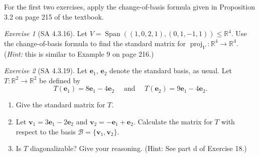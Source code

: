 \documentclass[fleqn,11pt]{paper}
\theoremstyle{remark}
\newtheorem*{exercise}{Exercise}
\newtheorem*{solution}{{\bf Solution}}
\newcommand\R{\fld{R}}
\newcommand\proj{\ensuremath{\operatorname{proj}}}
\renewcommand{\vec}[1]{\mathbf{#1}}
\newcommand{\<}{\ensuremath{\langle}}
\renewcommand{\>}{\ensuremath{\rangle}}
\newcommand\fld[1]{\ensuremath{\mathbb{#1}}}
\newcommand\ve{\vec{e}}
\newcommand\vv{\vec{v}}
\newcommand\sB{\ensuremath{\mathcal B}}
\newcommand\Span{\ensuremath{\operatorname{Span}}}
\begin{document}
\vfill

 For the first two exercises, apply the change-of-basis formula given
in Proposition 3.2 on page 215 of the textbook.
\newpage

\begin{exercise}[SA 4.3.16]
Let $V = \Span((1, 0, 2, 1), (0, 1,-1, 1)) \leq \R^4$.
Use the change-of-basis formula to find the standard matrix for $\proj_V: \R^4 \to \R^4$.
({\it Hint:} this is similar to Example 9 on page 216.)
\end{exercise}
  
\newpage

\begin{exercise}[SA 4.3.19] 
Let $\ve_1$, $\ve_2$ denote the standard basis, as usual. Let $T : \R^2 \to \R^2$ be defined by
\[
T (\ve_1) = 8\ve_1 - 4\ve_2 \quad \text{ and } \quad 
T (\ve_2) = 9\ve_1 - 4\ve_2.
\]
\begin{enumerate}
\item 
Give the standard matrix for $T$.
\item Let $\vv_1 = 3\ve_1 - 2\ve_2$ and $\vv_2 = -\ve_1 + \ve_2$. Calculate the matrix for $T$ with respect to
the basis $\sB = \{\vv_1, \vv_2\}$.
\item Is $T$ diagonalizable? Give your reasoning. (Hint: See part d of Exercise
  18.)
\end{enumerate}
\end{exercise}
\end{document}

